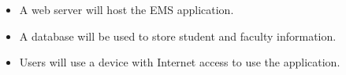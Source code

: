 \begin{itemize}
  \item A web server will host the EMS application. 
  \item A database will be used to store student and faculty information.
  \item Users will use a device with Internet access to use the application.
\end{itemize}  
  
